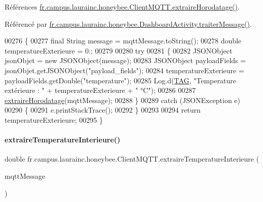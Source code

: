 Références \hyperlink{classfr_1_1campus_1_1laurainc_1_1honeybee_1_1_client_m_q_t_t_ace17d633909a5be8035518b9a6b528c2}{fr.\+campus.\+laurainc.\+honeybee.\+Client\+M\+Q\+T\+T.\+extraire\+Horodatage()}.



Référencé par \hyperlink{classfr_1_1campus_1_1laurainc_1_1honeybee_1_1_dashboard_activity_a50d4c14e993ff1779ae5dce8cee11216}{fr.\+campus.\+laurainc.\+honeybee.\+Dashboard\+Activity.\+traiter\+Message()}.


\begin{DoxyCode}
00276     \{
00277         \textcolor{keyword}{final} String message = mqttMessage.toString();
00278         \textcolor{keywordtype}{double} temperatureExterieure = 0.;
00279 
00280         \textcolor{keywordflow}{try}
00281         \{
00282             JSONObject jsonObjet = \textcolor{keyword}{new} JSONObject(message);
00283             JSONObject payloadFields = jsonObjet.getJSONObject(\textcolor{stringliteral}{"payload\_fields"});
00284             temperatureExterieure = payloadFields.getDouble(\textcolor{stringliteral}{"temperature"});
00285             Log.d(\hyperlink{classfr_1_1campus_1_1laurainc_1_1honeybee_1_1_client_m_q_t_t_a378324f705f8d7870c5f7be0cea02890}{TAG}, \textcolor{stringliteral}{"Temperature extérieure : "} + temperatureExterieure + \textcolor{stringliteral}{" °C"});
00286 
00287             \hyperlink{classfr_1_1campus_1_1laurainc_1_1honeybee_1_1_client_m_q_t_t_ace17d633909a5be8035518b9a6b528c2}{extraireHorodatage}(mqttMessage);
00288         \}
00289         \textcolor{keywordflow}{catch} (JSONException e)
00290         \{
00291             e.printStackTrace();
00292         \}
00293 
00294         \textcolor{keywordflow}{return}  temperatureExterieure;
00295     \}
\end{DoxyCode}
\mbox{\label{classfr_1_1campus_1_1laurainc_1_1honeybee_1_1_client_m_q_t_t_a92cd25872cdb04978a55ae166f858e0d}} 
\paragraph{\texorpdfstring{extraire\+Temperature\+Interieure()}{extraireTemperatureInterieure()}}
{\footnotesize\ttfamily double fr.\+campus.\+laurainc.\+honeybee.\+Client\+M\+Q\+T\+T.\+extraire\+Temperature\+Interieure (\begin{DoxyParamCaption}\item[{Mqtt\+Message}]{mqtt\+Message }\end{DoxyParamCaption})}



